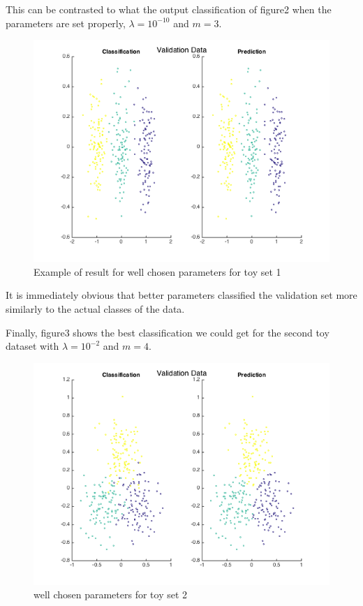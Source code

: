 \documentclass[12pt, twocolumn]{article}
\begin{document}
This can be contrasted to what the output classification of figure2 when the parameters are set properly, $\lambda=10^{-10}$ and $m=3$.

\begin{figure}
\includegraphics[scale=.4]{toy1val_lambda_min10_m_3.png}
\caption{ Example of result for well chosen parameters for toy set 1}
\end{figure}

It is immediately obvious that better parameters classified the validation set more similarly to the actual classes of the data. 

Finally, figure3 shows the best classification we could get for the second toy dataset with $\lambda=10^{-2}$ and $m=4$.

\begin{figure}
\includegraphics[scale=.4]{toy2val_lambda_min2_m_4.png}
\caption{ well chosen parameters for toy set 2}
\end{figure}
\end{document}

